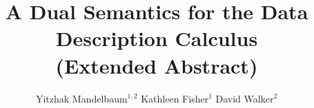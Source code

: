 \documentclass[tfpsymp,ams,pagenumbers]{tfp05symp}
\begin{document}
\title{A Dual Semantics for the Data Description Calculus\\(Extended Abstract)}
\author{Yitzhak Mandelbaum$^{1,2}$ \qquad Kathleen Fisher$^1$ \qquad David Walker$^2$}



\maketitle{}











\end{document}
